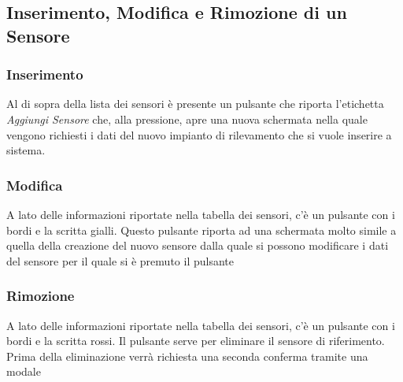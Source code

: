 \documentclass[a4paper, 12pt]{article}
\begin{document}
\subsection{Inserimento, Modifica e Rimozione di un Sensore}
\subsubsection{Inserimento}
Al di sopra della lista dei sensori è presente un pulsante che riporta l'etichetta \textit{Aggiungi Sensore} che, alla pressione, apre una nuova schermata nella quale vengono richiesti i dati del nuovo impianto di rilevamento che si vuole inserire a sistema.

\subsubsection{Modifica}
A lato delle informazioni riportate nella tabella dei sensori, c'è un pulsante con i bordi e la scritta gialli. Questo pulsante riporta ad una schermata molto simile a quella della creazione del nuovo sensore dalla quale si possono modificare i dati del sensore per il quale si è premuto il pulsante

\subsubsection{Rimozione}
A lato delle informazioni riportate nella tabella dei sensori, c'è un pulsante con i bordi e la scritta rossi. Il pulsante serve per eliminare il sensore di riferimento. Prima della eliminazione verrà richiesta una seconda conferma tramite una modale
\end{document}
